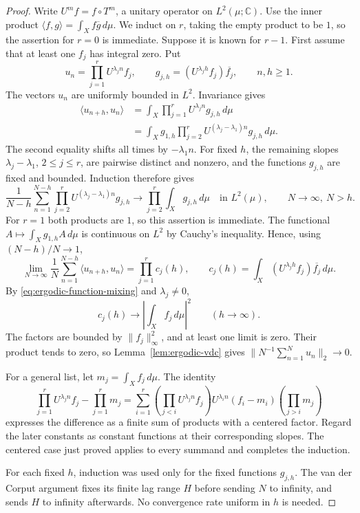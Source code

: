 \begin{proof}
Write \(U^m f=f\circ T^m\), a unitary operator on \(L^2(\mu;\mathbb C)\).
Use the inner product \(\langle f,g\rangle=\int_Xf\overline g\,d\mu\).
We induct on \(r\), taking the empty product to be \(1\), so the
assertion for \(r=0\) is immediate.  Suppose it is known for \(r-1\).
First assume that at least one \(f_j\) has integral zero.  Put
\[
 u_n=\prod_{j=1}^rU^{\lambda_jn}f_j,\qquad
 g_{j,h}=(U^{\lambda_jh}f_j)\overline{f_j},\qquad n,h\geq1.
\]
The vectors \(u_n\) are uniformly bounded in \(L^2\).  Invariance gives
\begin{align*}
 \langle u_{n+h},u_n\rangle
 &=\int_X\prod_{j=1}^rU^{\lambda_jn}g_{j,h}\,d\mu\\
 &=\int_Xg_{1,h}\prod_{j=2}^r
             U^{(\lambda_j-\lambda_1)n}g_{j,h}\,d\mu .
\end{align*}
The second equality shifts all times by \(-\lambda_1n\).
For fixed \(h\), the remaining slopes
\(\lambda_j-\lambda_1\), \(2\leq j\leq r\), are pairwise distinct and
nonzero, and the functions \(g_{j,h}\) are fixed and bounded.  Induction
therefore gives
\[
 \frac1{N-h}\sum_{n=1}^{N-h}
       \prod_{j=2}^rU^{(\lambda_j-\lambda_1)n}g_{j,h}
 \longrightarrow\prod_{j=2}^r\int_Xg_{j,h}\,d\mu
 \quad\text{in }L^2(\mu),\qquad N\to\infty,\ N>h.
\]
For \(r=1\) both products are \(1\), so this assertion is immediate.
The functional \(A\mapsto\int_Xg_{1,h}A\,d\mu\) is continuous on \(L^2\)
by Cauchy's inequality.  Hence, using \((N-h)/N\to1\),
\[
 \lim_{N\to\infty}\frac1N\sum_{n=1}^{N-h}
       \langle u_{n+h},u_n\rangle
   =\prod_{j=1}^r c_j(h),\qquad
 c_j(h)=\int_X(U^{\lambda_jh}f_j)\overline{f_j}\,d\mu .
\]
By \eqref{eq:ergodic-function-mixing} and \(\lambda_j\neq0\),
\[
 c_j(h)\longrightarrow\left|\int_Xf_j\,d\mu\right|^2
       \qquad(h\to\infty).
\]
The factors are bounded by \(\|f_j\|_\infty^2\), and at least one limit
is zero.  Their product tends to zero, so
Lemma~\ref{lem:ergodic-vdc} gives
\(\|N^{-1}\sum_{n=1}^Nu_n\|_2\to0\).

For a general list, let \(m_j=\int_Xf_j\,d\mu\).  The identity
\[
 \prod_{j=1}^rU^{\lambda_jn}f_j-\prod_{j=1}^rm_j
 =\sum_{i=1}^r
       \left(\prod_{j<i}U^{\lambda_jn}f_j\right)
       U^{\lambda_in}(f_i-m_i)
       \left(\prod_{j>i}m_j\right)
\]
expresses the difference as a finite sum of products with a centered
factor.  Regard the later constants as constant functions at their
corresponding slopes.  The centered case just proved applies to every
summand and completes the induction.

For each fixed \(h\), induction was used only for the fixed functions
\(g_{j,h}\).  The van der Corput argument fixes its finite lag range
\(H\) before sending \(N\) to infinity, and sends \(H\) to infinity
afterwards.  No convergence rate uniform in \(h\) is needed.
\end{proof}

